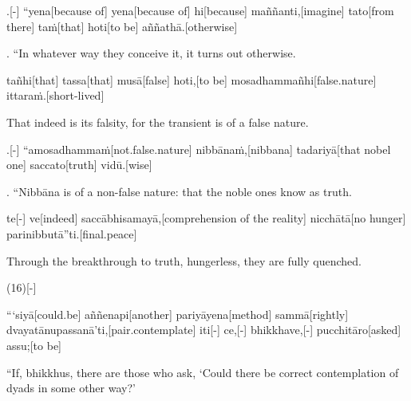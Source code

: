 \begin{samepage}
.[-] “yena[because of] yena[because of] hi[because] maññanti,[imagine] tato[from there] taṁ[that] hoti[to be] aññathā.[otherwise]
\endgl
\nopagebreak
\linespread{0.5}
\begin{spacin}{0.2}
{. “In whatever way they conceive it, it turns out otherwise.}
\end{spacin}
\vskip 12pt
\end{samepage}
\begin{samepage}
\begingl[glneveryline={\PaliGlossA,\PaliGlossB}]
tañhi[that] tassa[that] musā[false] hoti,[to be] mosadhammañhi[false.nature] ittaraṁ.[short-lived]
\endgl
\nopagebreak
\linespread{0.5}
\begin{spacin}{0.2}
{\PaliGlossFT That indeed is its falsity, for the transient is of a false nature.}
\end{spacin}
\vskip 12pt
\end{samepage}
\begin{samepage}
.[-] “amosadhammaṁ[not.false.nature] nibbānaṁ,[nibbana] tadariyā[that nobel one] saccato[truth] vidū.[wise]
\endgl
\nopagebreak
\linespread{0.5}
\begin{spacin}{0.2}
{. “Nibbāna is of a non-false nature:  that the noble ones know as truth.}
\end{spacin}
\vskip 12pt
\end{samepage}
\begin{samepage}
\begingl[glneveryline={\PaliGlossA,\PaliGlossB}]
te[-] ve[indeed] saccābhisamayā,[comprehension of the reality] nicchātā[no hunger] parinibbutā”ti.[final.peace]
\endgl
\nopagebreak
\linespread{0.5}
\begin{spacin}{0.2}
{\PaliGlossFT Through the breakthrough to truth, hungerless, they are fully quenched.}
\end{spacin}
\vskip 12pt
\end{samepage}
\vskip 0.2in
\begin{samepage}
\begingl[glneveryline={\PaliGlossA,\PaliGlossB}]
(16)[-]
\endgl
\nopagebreak
\linespread{0.5}
\begin{spacin}{0.2}
{}
\end{spacin}
\vskip 12pt
\end{samepage}
\begin{samepage}
\begingl[glneveryline={\PaliGlossA,\PaliGlossB}]
“‘siyā[could.be] aññenapi[another] pariyāyena[method] sammā[rightly] dvayatānupassanā’ti,[pair.contemplate] iti[-] ce,[-] bhikkhave,[-] pucchitāro[asked] assu;[to be]
\endgl
\nopagebreak
\linespread{0.5}
\begin{spacin}{0.2}
{\PaliGlossFT “If, bhikkhus, there are those who ask, ‘Could there be correct contemplation of dyads in some other way?’}
\end{spacin}
\vskip 12pt
\end{samepage}

